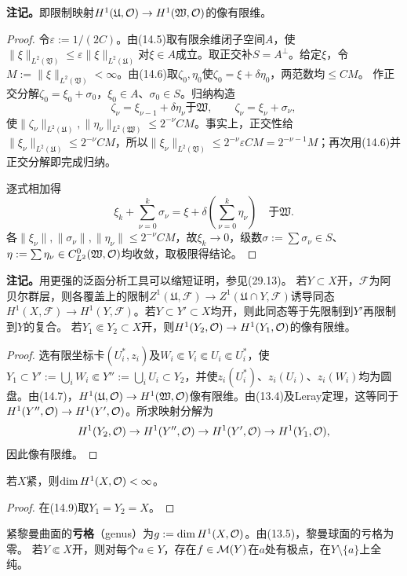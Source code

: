 \textbf{注记。}即限制映射$H^1(\mathfrak U,\mathcal O)\to H^1(\mathfrak W,\mathcal O)$的像有限维。
\begin{proof}
令$\varepsilon:=1/(2C)$。由(14.5)取有限余维闭子空间$A$，使$\|\xi\|_{L^2(\mathfrak V)}\le\varepsilon\|\xi\|_{L^2(\mathfrak U)}$对$\xi\in A$成立。取正交补$S=A^\perp$。给定$\xi$，令$M:=\|\xi\|_{L^2(\mathfrak V)}<\infty$。由(14.6)取$\zeta_0,\eta_0$使$\zeta_0=\xi+\delta\eta_0$，两范数均$\le CM$。
作正交分解$\zeta_0=\xi_0+\sigma_0$，$\xi_0\in A$、$\sigma_0\in S$。归纳构造
\[
\zeta_\nu=\xi_{\nu-1}+\delta\eta_\nu\text{于}\mathfrak W,\qquad
\zeta_\nu=\xi_\nu+\sigma_\nu,
\]
使$\|\zeta_\nu\|_{L^2(\mathfrak U)},\|\eta_\nu\|_{L^2(\mathfrak W)}\le2^{-\nu}CM$。事实上，正交性给$\|\xi_\nu\|_{L^2(\mathfrak U)}\le2^{-\nu}CM$，所以$\|\xi_\nu\|_{L^2(\mathfrak V)}\le2^{-\nu}\varepsilon CM=2^{-\nu-1}M$；再次用(14.6)并正交分解即完成归纳。

逐式相加得
\[
\xi_k+\sum_{\nu=0}^k\sigma_\nu=\xi+\delta\left(\sum_{\nu=0}^k\eta_\nu\right)\quad\text{于}\mathfrak W.
\]
各$\|\xi_\nu\|,\|\sigma_\nu\|,\|\eta_\nu\|\le2^{-\nu}CM$，故$\xi_k\to0$，级数$\sigma:=\sum\sigma_\nu\in S$、$\eta:=\sum\eta_\nu\in C^0_{L^2}(\mathfrak W,\mathcal O)$均收敛，取极限得结论。
\end{proof}
\textbf{注记。}用更强的泛函分析工具可以缩短证明，参见(29.13)。
若$Y\subset X$开，$\mathcal F$为阿贝尔群层，则各覆盖上的限制$Z^1(\mathfrak U,\mathcal F)\to Z^1(\mathfrak U\cap Y,\mathcal F)$诱导同态$H^1(X,\mathcal F)\to H^1(Y,\mathcal F)$。若$Y\subset Y'\subset X$均开，则此同态等于先限制到$Y'$再限制到$Y$的复合。
若$Y_1\Subset Y_2\subset X$开，则$H^1(Y_2,\mathcal O)\to H^1(Y_1,\mathcal O)$的像有限维。
\begin{proof}
选有限坐标卡$(U_i^*,z_i)$及$W_i\Subset V_i\Subset U_i\Subset U_i^*$，使
$Y_1\subset Y':=\bigcup_iW_i\Subset Y'':=\bigcup_iU_i\subset Y_2$，并使$z_i(U_i^*)$、$z_i(U_i)$、$z_i(W_i)$均为圆盘。由(14.7)，$H^1(\mathfrak U,\mathcal O)\to H^1(\mathfrak W,\mathcal O)$像有限维。由(13.4)及Leray定理，这等同于$H^1(Y'',\mathcal O)\to H^1(Y',\mathcal O)$。所求映射分解为
\[
H^1(Y_2,\mathcal O)\to H^1(Y'',\mathcal O)\to H^1(Y',\mathcal O)\to H^1(Y_1,\mathcal O),
\]
因此像有限维。
\end{proof}
若$X$紧，则$\dim H^1(X,\mathcal O)<\infty$。
\begin{proof}在(14.9)取$Y_1=Y_2=X$。\end{proof}
紧黎曼曲面的\textbf{亏格}（genus）为$g:=\dim H^1(X,\mathcal O)$。由(13.5)，黎曼球面的亏格为零。
若$Y\Subset X$开，则对每个$a\in Y$，存在$f\in\mathcal M(Y)$在$a$处有极点，在$Y\setminus\{a\}$上全纯。
